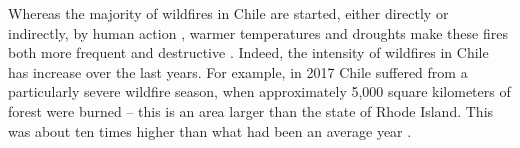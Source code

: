 \documentclass[11pt]{article}
\begin{document}
\begin{spacing}{1.3}
Whereas the majority of wildfires in Chile are started, either directly or indirectly, by human action \citep{CONAF2022}, warmer temperatures and droughts make these fires both more frequent and destructive \citep{westerling2006warming}. Indeed, the intensity of wildfires in Chile has increase over the last years. For example, in 2017 Chile suffered from a particularly severe wildfire season, when approximately 5,000 square kilometers of forest were burned -- this is an area larger than the state of Rhode Island. This was about ten times higher than what had been an average year \citep{CONAF2022}.





\end{spacing}
\end{document}
